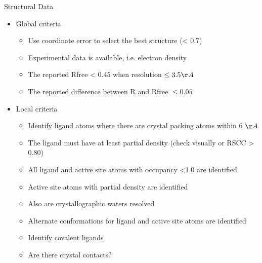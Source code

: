 \documentclass[9pt,bestpractices]{livecoms}
\begin{document}
\begin{Checklists*}[p!]

\begin{checklist}{Structural Data}
\begin{itemize}
    \begin{itemize}
    \item Global criteria
        \begin{itemize}
        \item Use coordinate error to select the best structure (< 0.7)
        \item Experimental data is available, i.e. electron density
        \item The reported Rfree < 0.45 when resolution $\le 3.5 \AA$
        \item The reported difference between R and Rfree $\le 0.05$
        \end{itemize}
    \item Local criteria
        \begin{itemize}
        \item Identify ligand atoms where there are crystal packing atoms within 6 $\AA$
        \item The ligand must have at least partial density (check visually or RSCC > 0.80)
        \item All ligand and active site atoms with occupancy <1.0 are identified
        \item Active site atoms with partial density are identified
        \item Also are crystallographic waters resolved
        \item Alternate conformations for ligand and active site atoms are identified
        \item Identify covalent ligands
        \item Are there crystal contacts? 
        \end{itemize}
    \end{itemize}

\end{itemize}
\end{checklist}
\end{Checklists*}
\end{document}
